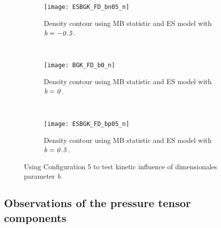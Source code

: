 \documentclass{rsproca}%
\begin{document}
\begin{figure}
        \centering
        \begin{subfigure}[b]{0.32\textwidth}
                \centering
                \texttt{[image: ESBGK\_FD\_bn05\_n]}
                \caption{Density contour using MB statistic and ES model with $\it{b=-0.5}$.}
                \label{fig:ESBGK_FD_bn05_n}
        \end{subfigure}%
        ~ %
        \begin{subfigure}[b]{0.32\textwidth}
                \centering
                \texttt{[image: BGK\_FD\_b0\_n]}
                \caption{Density contour using MB statistic and ES model with $\it{b=0}$.}
                \label{fig:BGK_FD_b0_n}
        \end{subfigure}
        ~ %
        \begin{subfigure}[b]{0.32\textwidth}
                \centering
                \texttt{[image: ESBGK\_FD\_bp05\_n]}
                \caption{Density contour using MB statistic and ES model with $\it{b=0.5}$.}
                \label{fig:ESBGK_FD_bp05_n}
        \end{subfigure}
        \caption{Using Configuration 5 to test kinetic influence of dimensionales parameter \it{b}.}\label{fig:test_b_parameter}
\end{figure}

\subsection{Observations of the pressure tensor components}
\end{document}
